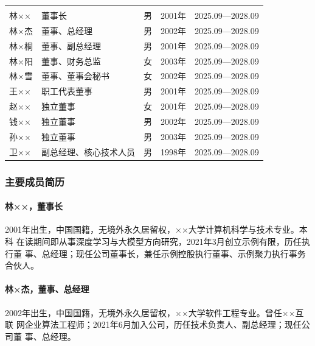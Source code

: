 \begin{gstab}
\begin{longtable}{|C{16mm}|L{50mm}|C{12mm}|C{18mm}|C{34mm}|}
\hline
{} &  &  &  &  \\ \hline
\endfirsthead
\hline
{} &  &  &  &  \\ \hline
\endhead
林×× & 董事长 & 男 & 2001年 & 2025.09—2028.09 \\ \hline
林×杰 & 董事、总经理 & 男 & 2002年 & 2025.09—2028.09 \\ \hline
林×桐 & 董事、副总经理 & 男 & 2001年 & 2025.09—2028.09 \\ \hline
林×阳 & 董事、财务总监 & 女 & 2003年 & 2025.09—2028.09 \\ \hline
林×雪 & 董事、董事会秘书 & 女 & 2002年 & 2025.09—2028.09 \\ \hline
王×× & 职工代表董事 & 男 & 2001年 & 2025.09—2028.09 \\ \hline
赵×× & 独立董事 & 女 & 2001年 & 2025.09—2028.09 \\ \hline
钱×× & 独立董事 & 男 & 2002年 & 2025.09—2028.09 \\ \hline
孙×× & 独立董事 & 男 & 2003年 & 2025.09—2028.09 \\ \hline
卫×× & 副总经理、核心技术人员 & 男 & 1998年 & 2025.09—2028.09 \\ \hline
\end{longtable}
\end{gstab}

\subsubsection{主要成员简历}

\paragraph{林××，董事长}
2001年出生，中国国籍，无境外永久居留权，××大学计算机科学与技术专业。本科
在读期间即从事深度学习与大模型方向研究，2021年3月创立示例有限，历任执行董
事、总经理；现任公司董事长，兼任示例控股执行董事、示例聚力执行事务合伙人。

\paragraph{林×杰，董事、总经理}
2002年出生，中国国籍，无境外永久居留权，××大学软件工程专业。曾任××互联
网企业算法工程师；2021年6月加入公司，历任技术负责人、副总经理；现任公司董
事、总经理。

